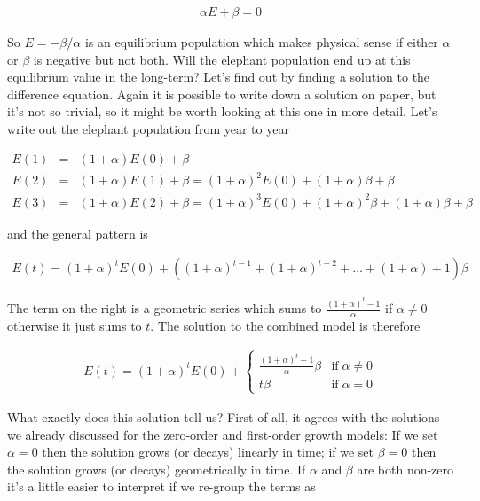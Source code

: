 \documentclass{tufte-handout}
\begin{document}
\begin{eqnarray*}
\alpha E + \beta = 0
\end{eqnarray*}

So $E = -\beta /\alpha$ is an equilibrium population which makes physical sense if either $\alpha$ or $\beta$ is negative but not both. Will the elephant population end up at this equilibrium value in the long-term? Let's find out by finding a solution to the difference equation. Again it is possible to write down a solution on paper, but it's not so trivial, so it might be worth looking at this one in more detail. Let's write out the elephant population from year to year

\begin{eqnarray*}
E(1) &=& (1+\alpha)E(0) + \beta \\
E(2) &=& (1+\alpha)E(1) + \beta = (1+\alpha)^2 E(0) + (1+\alpha)\beta + \beta \\
E(3) &=& (1+\alpha)E(2) + \beta = (1+\alpha)^3 E(0) + (1+\alpha)^2 \beta + (1+\alpha)\beta + \beta 
\end{eqnarray*}

and the general pattern is

\begin{eqnarray*}
E(t) = (1+\alpha)^t E(0) + ((1+\alpha)^{t-1} + (1+\alpha)^{t-2} + \ldots + (1+\alpha) + 1) \beta
\end{eqnarray*}

The term on the right is a geometric series which sums to $\frac{(1+\alpha)^t - 1}{\alpha}$ if $\alpha \ne 0$ otherwise it just sums to $t$. The solution to the combined model is therefore

\begin{eqnarray*}
E(t) = (1+\alpha)^t E(0) + \left\{
\begin{array}{cl}
\frac{(1+\alpha)^t - 1}{\alpha} \beta & \mbox{if} \; \alpha \ne 0 \\
t \beta & \mbox{if} \; \alpha = 0
\end{array}
\right.
\end{eqnarray*}

What exactly does this solution tell us? First of all, it agrees with the solutions we already discussed for the zero-order and first-order growth models: If we set $\alpha=0$ then the solution grows (or decays) linearly in time; if we set $\beta=0$ then the solution grows (or decays) geometrically in time. If $\alpha$ and $\beta$ are both non-zero it's a little easier to interpret if we re-group the terms as
\end{document}
